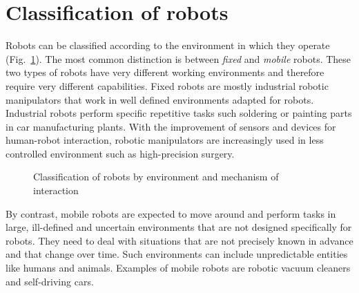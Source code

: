 \section{Classification of robots}\label{s.classification}

Robots can be classified according to the environment in which they operate (Fig.~\ref{fig.classification1}). The most common distinction is between \emph{fixed} and \emph{mobile} robots. These two types of robots have very different working environments and therefore require very different capabilities. Fixed robots are mostly industrial robotic manipulators that work in well defined environments adapted for robots. Industrial robots perform specific repetitive tasks such soldering or painting parts in car manufacturing plants. With the improvement of sensors and devices for human-robot interaction, robotic manipulators are increasingly used in less controlled environment such as high-precision surgery.

\begin{figure}
\begin{center}
\end{center}
\caption{Classification of robots by environment and mechanism of interaction}\label{fig.classification1}
\end{figure}

By contrast, mobile robots are expected to move around and perform tasks in large, ill-defined and uncertain environments that are not designed specifically for robots. They need to deal with situations that are not precisely known in advance and that change over time. Such environments can include unpredictable entities like humans and animals. Examples of mobile robots are robotic vacuum cleaners and self-driving cars. 

